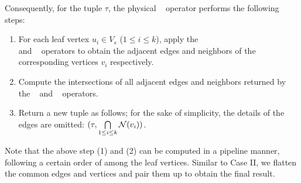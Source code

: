 Consequently, for the tuple $\tau$, the physical \expandintersect~ operator performs the following steps:



\begin{enumerate}
\item For each leaf vertex $u_i \in V_s$ ($1 \leq i \leq k$), apply the \expandedge~ \\ and \getvertex~ operators to obtain the adjacent edges and neighbors of the corresponding vertices $v_i$ respectively.
\item Compute the intersections of all adjacent edges and neighbors returned by the \expandedge~ and \getvertex~ operators.
\item Return a new tuple as follows; for the sake of simplicity, the details of the edges are omitted: $(\tau, \bigcap\limits_{1 \leq i \leq k}{\mathcal{N}}(v_i))$.


\end{enumerate}

Note that the above step (1) and (2) can be computed in a pipeline manner, following a certain order of among the leaf vertices.
Similar to Case II, we flatten the common edges and vertices and pair them up to obtain the final result.



